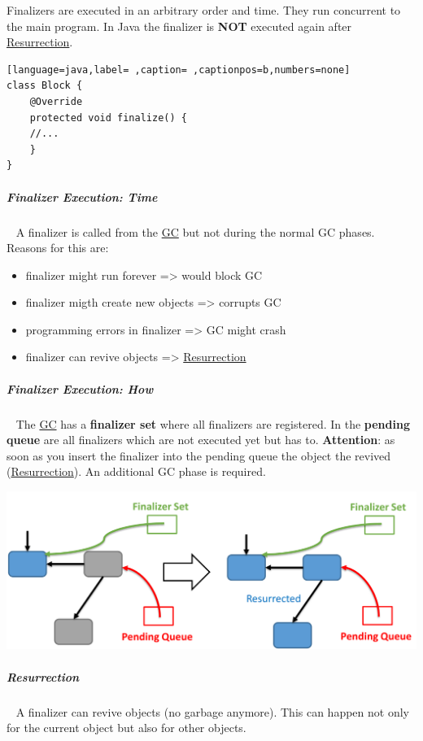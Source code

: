 \documentclass[11pt,twoside,landscape]{article}
\begin{document}
\begin{multicols}{3}
Finalizers are executed in an arbitrary order and time.
They run concurrent to the main program.
In Java the finalizer is \textbf{NOT} executed again after \href{../../../roam/20221231095240-what_is_resurrection.org}{Resurrection}.

\begin{lstlisting}[language=java,label= ,caption= ,captionpos=b,numbers=none]
class Block {
    @Override
    protected void finalize() {
	//...
    }
}
\end{lstlisting}
\subparagraph{Finalizer Execution: Time} \
\label{sec:org7e66c14}
A finalizer is called from the \href{../../../roam/20211008083744-garbage_collection.org}{GC} but not during the normal GC phases. 
Reasons for this are:
\begin{itemize}
\item finalizer might run forever => would block GC
\item finalizer migth create new objects => corrupts GC
\item programming errors in finalizer => GC might crash
\item finalizer can revive objects => \href{../../../roam/20221231095240-what_is_resurrection.org}{Resurrection}
\end{itemize}
\subparagraph{Finalizer Execution: How} \
\label{sec:orgddd6d6c}
The \href{../../../roam/20211008083744-garbage_collection.org}{GC} has a \textbf{finalizer set} where all finalizers are registered.
In the \textbf{pending queue} are all finalizers which are not executed yet but has to.
\textbf{Attention}: as soon as you insert the finalizer into the pending queue the object the revived (\href{../../../roam/20221231095240-what_is_resurrection.org}{Resurrection}).
An additional GC phase is required.


{
\begin{center}
\includegraphics[width=.9\linewidth]{img/pending_queue.png}
\end{center}
\captionof{figure}{Pending Queue}\label{fig:pending-queue}
}
\subparagraph{Resurrection} \
\label{sec:org126328a}
A finalizer can revive objects (no garbage anymore).
This can happen not only for the current object but also for other objects.



\end{multicols}
\end{document}

